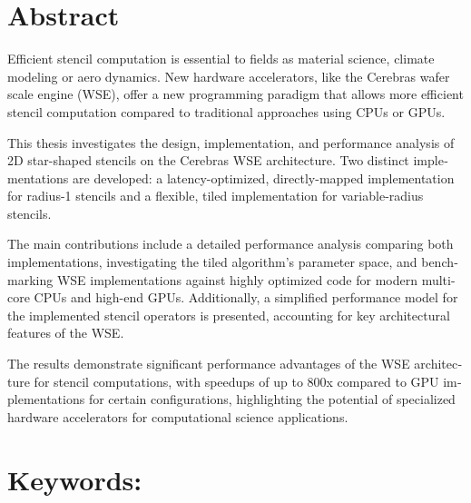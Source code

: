 \begin{otherlanguage}{english}
\section*{Abstract}
Efficient stencil computation is essential to fields as material science, climate modeling or aero dynamics. New hardware accelerators, like the Cerebras wafer scale engine (WSE), offer a new programming paradigm that allows more efficient stencil computation compared to traditional approaches using CPUs or GPUs.

This thesis investigates the design, implementation, and performance analysis of 2D star-shaped stencils on the Cerebras WSE architecture. Two distinct implementations are developed: a latency-optimized, directly-mapped implementation for radius-1 stencils and a flexible, tiled implementation for variable-radius stencils. 

The main contributions include a detailed performance analysis comparing both implementations, investigating the tiled algorithm's parameter space, and benchmarking WSE implementations against highly optimized code for modern multi-core CPUs and high-end GPUs. Additionally, a simplified performance model for the implemented stencil operators is presented, accounting for key architectural features of the WSE.

The results demonstrate significant performance advantages of the WSE architecture for stencil computations, with speedups of up to 800x compared to GPU implementations for certain configurations, highlighting the potential of specialized hardware accelerators for computational science applications.

\section*{Keywords:} \itshape \englishkeywords
\end{otherlanguage}